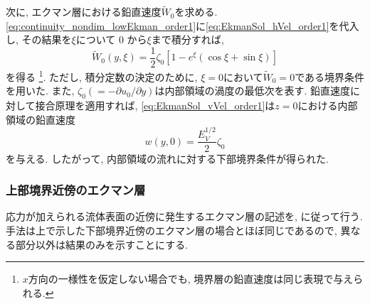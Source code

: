 次に, エクマン層における鉛直速度$\tilde{W}_0$を求める. 
\eqref{eq:continuity_nondim_lowEkman_order1}に\eqref{eq:EkmanSol_hVel_order1}を代入し, 
その結果を$\xi$について 0 から$\xi$まで積分すれば, 
\begin{equation}
\boxed{
 \tilde{W}_0(y,\xi) = \dfrac{1}{2} \zeta_0 
    \left[ 1 - e^{\xi}(\cos{\xi} + \sin{\xi} ) \right]
}
\label{eq:EkmanSol_vVel_order1}
\end{equation}
を得る%
\footnote{
$x$方向の一様性を仮定しない場合でも, 境界層の鉛直速度は同じ表現で与えられる. 
}. 
ただし, 積分定数の決定のために, $\xi=0$において$\tilde{W}_0=0$である境界条件を用いた. 
また, $\zeta_0(=-\partial u_0/\partial y)$は内部領域の渦度の最低次を表す. 
鉛直速度に対して接合原理を適用すれば, \eqref{eq:EkmanSol_vVel_order1}は$z=0$における内部領域の鉛直速度
\begin{equation}
\boxed{
 w(y,0) = \dfrac{E_V^{1/2}}{2} \zeta_0 
}
\label{eq:BC_interior_btm_nodim}
\end{equation}
を与える. 
したがって, 内部領域の流れに対する下部境界条件が得られた. 

\subsubsection*{上部境界近傍のエクマン層}
応力が加えられる流体表面の近傍に発生するエクマン層の記述を, \citet[section 4.10]{pedlosky1987geophysical} に従って行う. 
手法は上で示した下部境界近傍のエクマン層の場合とほぼ同じであるので, 
異なる部分以外は結果のみを示すことにする. 


